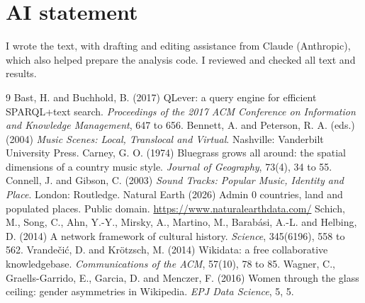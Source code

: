 \documentclass[11pt,a4paper]{article}
\begin{document}
\section*{AI statement}
I wrote the text, with drafting and editing assistance from Claude (Anthropic), which also helped prepare the analysis code. I reviewed and checked all text and results.

\begin{thebibliography}{9}
 Bast, H. and Buchhold, B. (2017) QLever: a query engine for efficient SPARQL+text search. \emph{Proceedings of the 2017 ACM Conference on Information and Knowledge Management}, 647 to 656.
 Bennett, A. and Peterson, R. A. (eds.) (2004) \emph{Music Scenes: Local, Translocal and Virtual}. Nashville: Vanderbilt University Press.
 Carney, G. O. (1974) Bluegrass grows all around: the spatial dimensions of a country music style. \emph{Journal of Geography}, 73(4), 34 to 55.
 Connell, J. and Gibson, C. (2003) \emph{Sound Tracks: Popular Music, Identity and Place}. London: Routledge.
 Natural Earth (2026) Admin 0 countries, land and populated places. Public domain. \url{https://www.naturalearthdata.com/}
 Schich, M., Song, C., Ahn, Y.-Y., Mirsky, A., Martino, M., Barab\'asi, A.-L. and Helbing, D. (2014) A network framework of cultural history. \emph{Science}, 345(6196), 558 to 562.
 Vrandečić, D. and Krötzsch, M. (2014) Wikidata: a free collaborative knowledgebase. \emph{Communications of the ACM}, 57(10), 78 to 85.
 Wagner, C., Graells-Garrido, E., Garcia, D. and Menczer, F. (2016) Women through the glass ceiling: gender asymmetries in Wikipedia. \emph{EPJ Data Science}, 5, 5.
\end{thebibliography}
\end{document}
